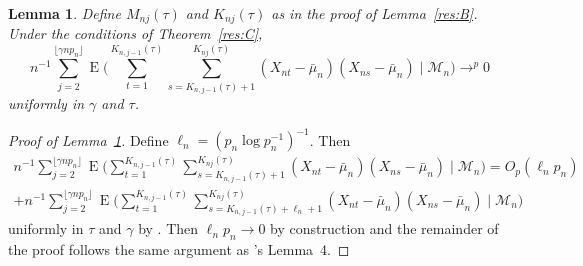 \documentclass[12pt]{article}
\newcommand\citepos[2][]{\citeauthor{#2}'s \citeyearpar[#1]{#2}}
\newtheorem{lema}{Lemma}[section]
\theoremstyle{definition}
\DeclareMathOperator{\E}{E}
\begin{document}
\begin{lema}\label{res:a6}
  Define $M_{nj}(\tau)$ and $K_{nj}(\tau)$ as in the proof of
  Lemma~\ref{res:B}.  Under the conditions of Theorem~\ref{res:C}, 
  \begin{equation}
    n^{-1} \sum_{j=2}^{\lfloor \gamma n p_n \rfloor} \E \Bigg(
    \sum_{t=1}^{K_{n,j-1}(\tau)} \sum_{s=K_{n,j-1}(\tau)+1}^{K_{nj}(\tau)}
    (X_{nt} - \bar{\mu}_n) (X_{ns} - \bar{\mu}_n) \;\Big|\;
    \mathcal{M}_n\Bigg) \to^p 0
  \end{equation}
  uniformly in $\gamma$ and $\tau$.
\end{lema}
\begin{proof}[Proof of Lemma~\ref{res:a6}]
  Define $\ell_n = (p_n \log p_n^{-1})^{-1}$.  Then
  \begin{multline}
    n^{-1} \sum_{j=2}^{\lfloor \gamma n p_n \rfloor} \E \Bigg(
    \sum_{t=1}^{K_{n,j-1}(\tau)} \sum_{s=K_{n,j-1}(\tau)+1}^{K_{nj}(\tau)}
    (X_{nt} - \bar{\mu}_n) (X_{ns} - \bar{\mu}_n) \;\Big|\;
    \mathcal{M}_n\Bigg) = O_p(\ell_n p_n) \\
    + n^{-1} \sum_{j=2}^{\lfloor \gamma n p_n \rfloor} \E \Bigg(
    \sum_{t=1}^{K_{n,j-1}(\tau)}
    \sum_{s=K_{n,j-1}(\tau)+\ell_n+1}^{K_{nj}(\tau)} (X_{nt} - \bar{\mu}_n)
    (X_{ns} - \bar{\mu}_n) \;\Bigg|\; \mathcal{M}_n\Bigg)
  \end{multline}
  uniformly in $\tau$ and $\gamma$ by \citet[Theorem~1.6]{Mcl:75}.
  Then $\ell_n p_n \to 0$ by construction and the remainder of the
  proof follows the same argument as \citepos{Jon:97} Lemma~4.
\end{proof}
\end{document}
